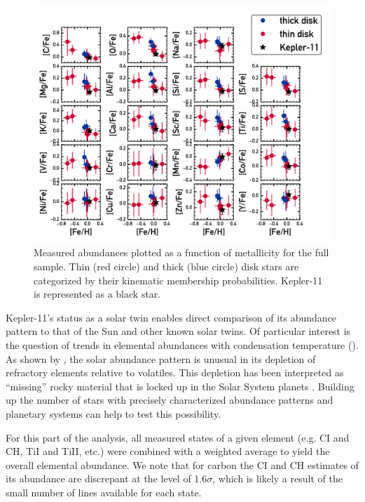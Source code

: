 \documentclass[oneside]{emulateapj}
\begin{document}
\begin{figure}
\centering
\includegraphics[scale=0.7]{xh}
\caption{Measured abundances plotted as a function of metallicity for the full sample. Thin (red circle) and thick (blue circle) disk stars are categorized by their kinematic membership probabilities. Kepler-11 is represented as a black star.}
\label{fig:xh}
\end{figure}

Kepler-11's status as a solar twin enables direct comparison of its abundance pattern to that of the Sun and other known solar twins. Of particular interest is the question of trends in elemental abundances with condensation temperature (\tc). As shown by \citet{Melendez2009}, the solar abundance pattern is unusual in its depletion of refractory elements relative to volatiles. This depletion has been interpreted as ``missing'' rocky material that is locked up in the Solar System planets \citep{Chambers2010}. Building up the number of stars with precisely characterized abundance patterns and planetary systems can help to test this possibility.

For this part of the analysis, all measured states of a given element (e.g. CI and CH, TiI and TiII, etc.) were combined with a weighted average to yield the overall elemental abundance. We note that for carbon the CI and CH estimates of its abundance are discrepant at the level of 1.6$\sigma$, which is likely a result of the small number of lines available for each state. 
\end{document}
